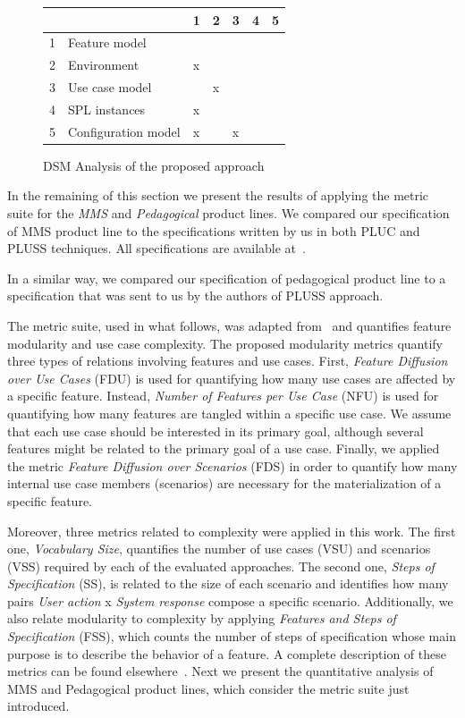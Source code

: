 \documentclass{acm_proc_article-sp}
\begin{document}
{\begin{figure}[h]
\centering
\begin{small}
\begin{tabular}{lllllll} \hline
& & 1 & 2 & 3 & 4 & 5 \\ \hline
1 & Feature model 		& 	& 	&      &  	&  	\\ 
2 & Environment & x	&	&	&	&  	\\
3 & Use case model 	&  	&  x	&  	&  	& 	\\
4 & SPL instances 		& x 	& 	& 	&   	& 	\\
5 & Configuration model 	& x 	&  	&  x	&  	& 	\\  \hline
\end{tabular}
\end{small}
\caption{DSM Analysis of the proposed approach}
\label{dsm:cc}
\end{figure}   

 
In the remaining of this section we present the results of applying the metric suite for 
the \emph{MMS} and \emph{Pedagogical} product lines. We compared our specification of MMS product line to the specifications written by us in both PLUC and PLUSS techniques. All specifications are available at~\cite{spg-url}.  

In a similar way, we compared our specification of pedagogical product line to a specification 
that was sent to us by the authors of PLUSS approach. 

The metric suite, used in what follows, was adapted from~\cite{garcia-taosd-2005} and quantifies 
feature modularity and use case complexity. The proposed modularity 
metrics quantify three types of relations involving features and use cases.
First, \emph{Feature Diffusion over Use Cases} (FDU) is used for
quantifying how many use cases are affected by a specific
feature. Instead, \emph{Number of Features per Use Case} (NFU) is used for quantifying
how many features are tangled within a specific use
case. We assume that each use case should be interested in
its primary goal, although several features might be related
to the primary goal of a use case. Finally, we applied
the metric \emph{Feature Diffusion over Scenarios} (FDS) in order
to quantify how many internal use case members (scenarios)
are necessary for the materialization of a specific feature.
 
Moreover, three metrics related to complexity were applied in this work.
The first one, \emph{Vocabulary Size}, quantifies the number of use
cases (VSU) and scenarios (VSS) required by each of the evaluated
approaches. The second one, \emph{Steps of Specification}
(SS), is related to the size of each scenario and identifies
how many pairs \emph{User action} x \emph{System response} compose a
specific scenario. Additionally, we also relate modularity to
complexity by applying \emph{Features and Steps of Specification}
(FSS), which counts the number of steps of specification
whose main purpose is to describe the behavior of a feature. 
A complete description of these metrics can be found elsewhere~\cite{rbonifacio-ea-2008}. Next we 
present the quantitative analysis of MMS and Pedagogical product lines, which consider the metric suite
just introduced.  

}
\end{document}
